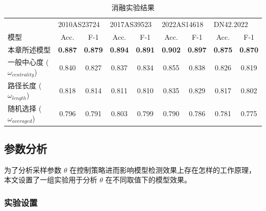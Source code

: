 \begin{table}
    \caption{消融实验结果}
    \begin{tabular}{lcccccccc}
        \toprule                      & \multicolumn{2}{l}{2010AS23724} & \multicolumn{2}{l}{2017AS39523} & \multicolumn{2}{l}{2022AS14618} & \multicolumn{2}{l}{DN42.2022}                                                                     \\ \cmidrule(lr){2-3} \cmidrule(lr){4-5} \cmidrule(lr){6-7} \cmidrule(lr){8-9}
        模型                            & Acc.                            & F-1                             & Acc.                            & F-1                           & Acc.           & F-1            & Acc.           & F-1            \\ \midrule
        本章所述模型                        & \textbf{0.887}                  & \textbf{0.879}                  & \textbf{0.894}                  & \textbf{0.891}                & \textbf{0.902} & \textbf{0.897} & \textbf{0.875} & \textbf{0.870} \\
        一般中心度 ($\omega_{centrality}$) & 0.840                           & 0.827                           & 0.837                           & 0.834                         & 0.855          & 0.838          & 0.826          & 0.819          \\
        路径长度 ($\omega_{length}$)      & 0.818                           & 0.814                           & 0.811                           & 0.810                         & 0.835          & 0.829          & 0.817          & 0.802          \\
        随机选择 ($\omega_{averaged}$)    & 0.796                           & 0.791                           & 0.803                           & 0.799                         & 0.790          & 0.786          & 0.781          & 0.775          \\
        \bottomrule
    \end{tabular}
    \label{c5_s3tab}
\end{table}

\subsection{参数分析}

为了分析采样参数 $\theta$ 在控制策略进而影响模型检测效果上存在怎样的工作原理，本文设置了一组实验用于分析 $\theta$ 在不同取值下的模型效果。

\subsubsection{实验设置}

